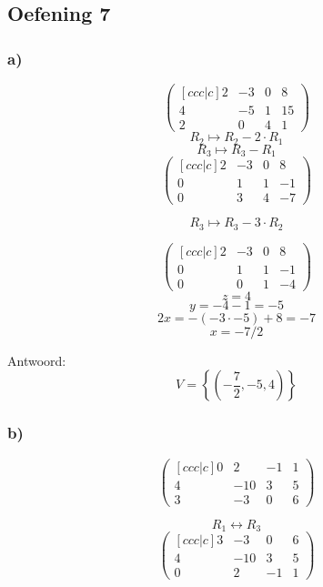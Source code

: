 \documentclass[lineaire_algebra_oplossingen.tex]{subfiles}
\begin{document}
\subsection{Oefening 7}
\subsubsection*{a)}
\[
\begin{pmatrix}[ccc|c]
2 & -3 & 0 & 8\\
4 & -5 & 1 & 15\\
2 & 0 & 4 & 1
\end{pmatrix}
\]
\[ R_2 \longmapsto R_2 - 2\cdot R_1\]
\[ R_3 \longmapsto R_3 -  R_1\]
\[
\begin{pmatrix}[ccc|c]
2 & -3 & 0 & 8\\
0 & 1 & 1 & -1\\
0 & 3 & 4 & -7
\end{pmatrix}
\]

\[ R_3 \longmapsto R_3 - 3\cdot R_2\]

\[
\begin{pmatrix}[ccc|c]
2 & -3 & 0 & 8\\
0 & 1 & 1 & -1\\
0 & 0 & 1 & -4
\end{pmatrix}
\]
\[
z = 4\]
\[y = -4-1 = -5\]
\[2x = -(-3\cdot -5) + 8=-7\]
\[ x = -7/2\]

Antwoord:
\[
V = \left\{\left( -\frac{7}{2},-5,4 \right)\right\}
\]

\subsubsection*{b)}
\[
\begin{pmatrix}[ccc|c]
0 & 2 & -1 & 1\\
4 & -10 & 3 & 5\\
3 & -3 & 0 & 6
\end{pmatrix}
\]

\[ R_1 \leftrightarrow R_3\]
\[
\begin{pmatrix}[ccc|c]
3 & -3 & 0 & 6\\
4 & -10 & 3 & 5\\
0 & 2 & -1 & 1
\end{pmatrix}
\]
\end{document}
